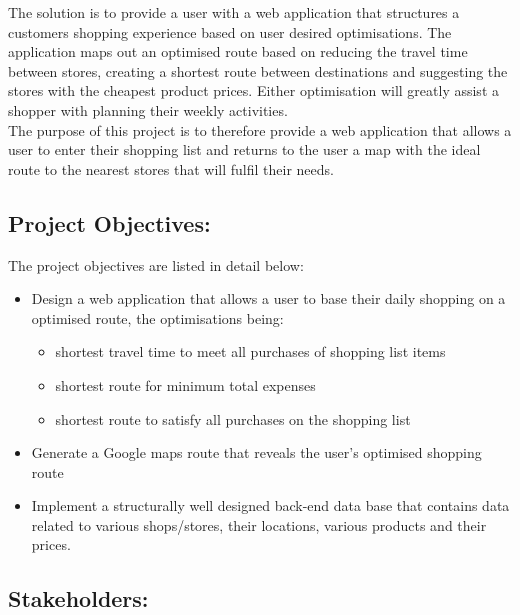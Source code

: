\documentclass[10pt, a4paper, twocolumn]{scrartcl}
\begin{document}
		The solution is to provide a user with a web application that structures a customers shopping experience based on user desired optimisations. The application maps out an optimised route based on reducing the travel time between stores, creating a shortest route between destinations and suggesting the stores with the cheapest product prices. Either optimisation will greatly assist a shopper with planning their weekly activities. \\
		
		The purpose of this project is to therefore provide a web application that allows a user to enter their shopping list and returns to the user a map with the ideal route to the nearest stores that will fulfil their needs. 
	
	\subsection{Project Objectives:}
	
		The project objectives are listed in detail below:
		
			\begin{itemize}[noitemsep]
				\item Design a web application that allows a user to base their daily shopping on a optimised route, the optimisations being:
					\begin{itemize}
						\item shortest travel time to meet all purchases of shopping list items 
						\item shortest route for minimum total expenses
						\item shortest route to satisfy all purchases on the shopping list 
					\end{itemize}
				\item Generate a Google maps route that reveals the user's optimised shopping route
				\item Implement a structurally well designed back-end data base that contains data related to various shops/stores, their locations, various products and their prices. 
			\end{itemize}
	
	\subsection{Stakeholders:}
	
	
\onecolumn 
\end{document}
